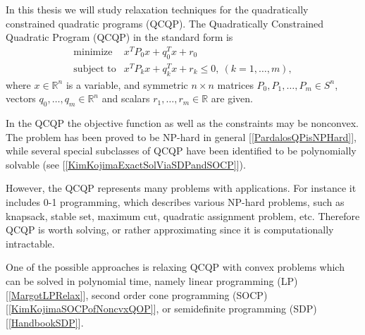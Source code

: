 \documentclass[12pt]{book}
\theoremstyle{definition}
\begin{document}
In this thesis we will study relaxation techniques for the quadratically constrained quadratic programs (QCQP).
\label{defQCQP}
The Quadratically Constrained Quadratic Program (QCQP) in the standard form is
\begin{equation}
\label{qcqp} 
\begin{array}{ll}
\mbox{minimize}& x^TP_0x + q_0^Tx +r_0 \\
\mbox{subject to}& x^TP_kx + q_k^Tx + r_k \leq 0, \  (k = 1,\dots ,m),
\end{array} 
\end{equation}
where $x\in \mathbb{R}^n$ is a variable, and symmetric $n\times n$ matrices $P_0, P_1, \dots ,P_m \in S^n$, vectors $q_0,\dots ,q_m \in \mathbb{R}^n$ and scalars $r_1,\dots ,r_m\in \mathbb{R}$ are given.

%

In the QCQP the objective function as well as the constraints may be nonconvex. The problem has been proved to be NP-hard in general [\ref{PardalosQPisNPHard}], while several special subclasses
of QCQP have been identified to be polynomially solvable (see [\ref{KimKojimaExactSolViaSDPandSOCP}]).

However, the QCQP represents many problems with applications. For instance it includes 0-1 programming, which describes various NP-hard problems, such as knapsack, stable set, maximum cut, quadratic assignment problem,  etc. Therefore QCQP is worth solving, or rather approximating since it is computationally intractable.

One of the possible approaches is relaxing QCQP with convex problems which can be solved in polynomial time, namely linear programming (LP) [\ref{MargotLPRelax}], second order cone programming  (SOCP) [\ref{KimKojimaSOCPofNoncvxQOP}], or semidefinite programming (SDP) [\ref{HandbookSDP}].
\end{document}

